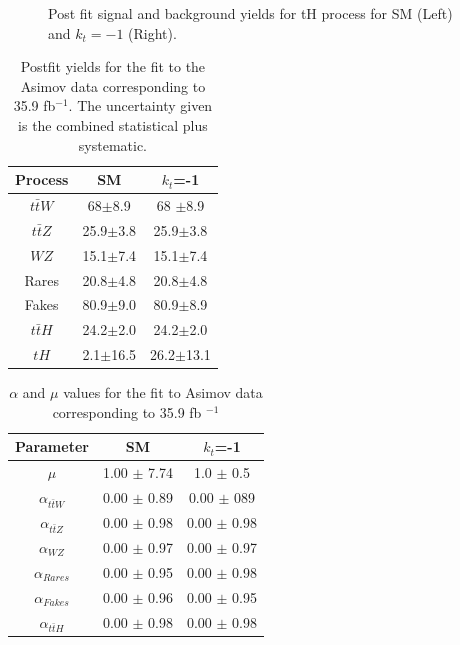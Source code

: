 \begin{figure}[!htbp]
\begin{minipage}[b]{0.48\textwidth}
		\end{minipage}
		\caption{Post fit signal and background yields for tH process for SM (Left) and $k_t=-1$ (Right).
		}
		\label{simple}
	\end{figure}
	
	\begin{table}[ht!]
		\centering
		\caption{Postfit  yields for the fit to the Asimov data corresponding to 35.9 fb$^{-1}$. The uncertainty given is the combined statistical plus systematic.}
		\begin{tabular}{ccc}
			\hline
			Process  & SM    & $k_{t}$=-1 \\
			\hline
			$t\bar{t}W$  &  68$\pm$8.9& 68 $\pm$8.9 \\
			$t\bar{t}Z$  & 25.9$\pm$3.8&25.9$\pm$3.8\\
			$WZ$ &  15.1$\pm$7.4& 15.1$\pm$7.4\\
			Rares &  20.8$\pm$4.8& 20.8$\pm$4.8 \\
			Fakes  &  80.9$\pm$9.0&  80.9$\pm$8.9 \\
			$t\bar{t}H$  &   24.2$\pm$2.0 &  24.2$\pm$2.0 \\
			\hline
			$tH$&  2.1$\pm$16.5 &26.2$\pm$13.1 
		\end{tabular}
		\label{table1}
	\end{table}
	
	
	\begin{table}[ht!]
		\small
		\centering
		\caption{$\alpha$ and $\mu$ values  for the fit to Asimov data corresponding to 35.9 fb $^{-1}$}
		\begin{tabular}{ccc}
			\hline
			Parameter  & SM &$k_t$=-1\\
			\hline
			$\mu$   & 1.00 $\pm$  7.74& 1.0 $\pm$  0.5\\
			$\alpha_{t\bar{t}W}$&  0.00 $\pm$  0.89&  0.00 $\pm$  089\\
			$\alpha_{t\bar{t}Z}$ &  0.00 $\pm$  0.98& 0.00 $\pm$  0.98\\
			$\alpha_{WZ}$   & 0.00 $\pm$  0.97& 0.00 $\pm$  0.97\\
			$\alpha_{Rares}$   &0.00 $\pm$  0.95&0.00 $\pm$  0.98 \\
			$\alpha_{Fakes}$ &   0.00 $\pm$  0.96& 0.00 $\pm$  0.95\\
			$\alpha_{t\bar{t}H}$ &0.00 $\pm$  0.98& 0.00 $\pm$ 0.98\\
		\end{tabular}
		\label{parameters}
	\end{table}
	
